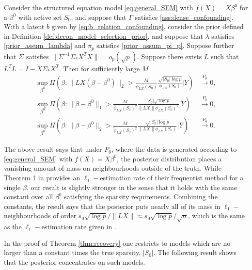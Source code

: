 \documentclass[11pt]{article}
\newcommand{\postCov}{\Sigma_*}
\begin{document}
\begin{theorem}\label{thm:recovery}
		Consider the structured equation model \eqref{eq:general_SEM} with $f(X) = X\beta^0$ for a $\beta^0$ with active set $S_0$, and suppose that $\Gamma$ satisfies \eqref{ass:dense_confounding}. With a latent $b$ given by \eqref{eq:b_relation_confounding}, consider the prior defined in Definition \ref{def:decon_model_selection_prior}, and suppose that {\color{assumption} $\lambda$ satisfies \eqref{prior_assum_lambda} and $\pi_p$ satisfies \eqref{prior_assum_pi_p}}. Suppose further that $\Sigma$ satisfies {\color{assumption}$\|\Sigma^{-1} \postCov X^TX\| = o_p(\sqrt{p})$}. Suppose there exists $L$ such that $L^TL = I - X\postCov X^T$.
		  Then for sufficiently large $M$
\begin{align*}
	\sup_{\beta^0} \Pi\left(\beta: \|LX(\beta - \beta^0)\|_2 > \frac{M}{\bar{\psi}_{LX}(S_0)} \frac{\sqrt{|S_0|\log p}}{\phi_{LX}(S_0)} | Y \right) &\xrightarrow{P_0} 0, \\
		\sup_{\beta^0} \Pi\left(\beta: \|\beta - \beta^0\|_1 > \frac{M}{\bar{\psi}_{LX}(S_0)^2} \frac{|S_0|\sqrt{\log p}}{\|LX\|\phi_{LX}(S_0)^2} | Y \right) &\xrightarrow{P_0} 0, \\
		\sup_{\beta^0} \Pi\left(\beta: \|\beta - \beta^0\|_2 > \frac{M}{\tilde{\psi}_{LX}(S_0)^2} \frac{\sqrt{|S_0|\log p}}{\|LX\|\phi_{LX}(S_0)} | Y \right) &\xrightarrow{P_0} 0.
\end{align*}
\end{theorem}
The above result says that under $P_0$, where the data is generated according to \eqref{eq:general_SEM} with $f(X) = X\beta^0$, the posterior distribution places a vanishing amount of mass on neighbourhoods outside of the truth. While Theorem 1 in \cite{CBM2020} provides an $\ell_1-$estimation rate of their frequentist method for a single $\beta$, our result is  slightly stronger in the sense that it holds with the same constant over all $\beta^0$ satisfying the sparsity requirements. Combining the constants, the result says that the posterior puts nearly all of its mass in $\ell_1-$neighbourhoods of order $s_0 \sqrt{\log p}/\|LX\| \approx s_0 \sqrt{\log p}/\sqrt{n}$, which is the same as the $\ell_1-$estimation rate given in \cite{CBM2020}.

In the proof of Theorem \ref{thm:recovery} one restricts to models which are no larger than a constant times the true sparsity, $|S_0|$. The following result shows that the posterior concentrates on such models.
\end{document}
